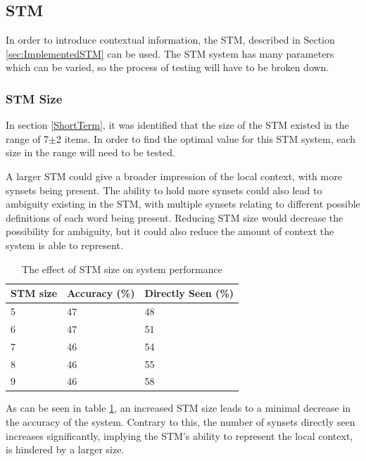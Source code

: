 \documentclass[]{article}
\begin{document}
\subsection{STM}
\label{sec:EvSTM}
In order to introduce contextual information, the STM, described in Section \ref{sec:ImplementedSTM} can be used. The STM system has many parameters which can be varied, so the process of testing will have to be broken down.

\subsubsection{STM Size}
\label{sec:EvSTMSize}
In section \ref{ShortTerm}, it was identified that the size of the STM existed in the range of 7$\pm$2 items. In order to find the optimal value for this STM system, each size in the range will need to be tested.

A larger STM could give a broader impression of the local context, with more synsets being present. The ability to hold more synsets could also lead to ambiguity existing in the STM, with multiple synsets relating to different possible definitions of each word being present. Reducing STM size would decrease the possibility for ambiguity, but it could also reduce the amount of context the system is able to represent.

\begin{table}
\begin{center}
\begin{tabular}{|p{8em}|p{8em}|p{8em}|}
	\hline
	STM size & Accuracy (\%) & Directly Seen (\%) \\
	\hline
	5 & 47 & 48\\
	\hline
	6 & 47 & 51\\
	\hline
	7 & 46 & 54\\
	\hline
	8 & 46 & 55\\
	\hline
	9 & 46 & 58\\
	\hline
\end{tabular}
\end{center}
\caption{The effect of STM size on system performance}
\label{table:STMSize}
\end{table}

As can be seen in table \ref{table:STMSize}, an increased STM size leads to a minimal decrease in the accuracy of the system. Contrary to this, the number of synsets directly seen increases significantly, implying the STM's ability to represent the local context, is hindered by a larger size.
\end{document}
